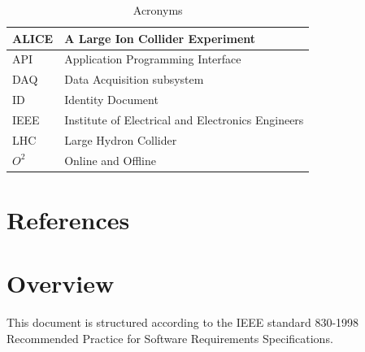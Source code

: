\begin{table}[h]
\begin{center}
\begin{longtable}{ll}
    \hline
    ALICE & A Large Ion Collider Experiment\\
    \hline
    API & Application Programming Interface\\
    \hline
    DAQ & Data Acquisition subsystem \\
    \hline
    ID & Identity Document\\
    \hline
    IEEE & Institute of Electrical and Electronics Engineers\\
    \hline
     LHC  & Large Hydron Collider\\
     \hline
     $O^2$ & Online and Offline\\
     \hline
    \end{longtable}
      \caption{Acronyms}
  \label{tab:acronyms}
  \end{center}
  
\end{table}




\section{References}

\section{Overview}
This document is structured according to the IEEE standard 830-1998 Recommended Practice for Software Requirements Specifications.
